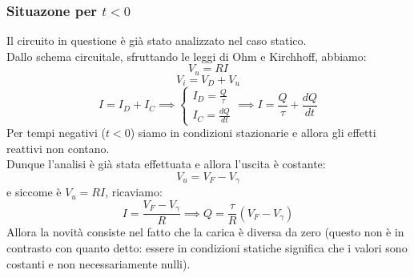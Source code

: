 \documentclass[../main.tex]{subfiles}
\begin{document}
	\subsubsection{Situazone per $t<0$}
	Il circuito in questione è già stato analizzato nel caso statico. \\
	Dallo schema circuitale, sfruttando le leggi di Ohm e Kirchhoff, abbiamo:
	$$V_u = RI$$
	$$V_i = V_D + V_u$$
	$$I = I_D + I_C \implies \begin{cases} I_D = \frac{Q}{\tau} \\ I_C = \frac{dQ}{dt} \end{cases} \implies I = \frac{Q}{\tau} + \frac{dQ}{dt}$$
	Per tempi negativi ($t < 0$) siamo in condizioni stazionarie e allora gli effetti reattivi non contano. \\
	Dunque l’analisi è già stata effettuata e allora l’uscita è costante:
	$$V_u = V_F - V_\gamma$$
	e siccome è $V_u = RI$, ricaviamo:
	$$I = \frac{V_F - V_\gamma}{R} \implies Q = \frac{\tau}{R} (V_F - V_\gamma)$$
	Allora la novità consiste nel fatto che la carica è diversa da zero (questo non è in contrasto con quanto detto: essere in condizioni statiche significa che i valori sono costanti e non necessariamente nulli).
\end{document}
